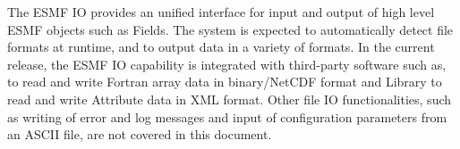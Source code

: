 

The ESMF IO provides an unified interface for input and output of
high level ESMF objects such as Fields.  The system is expected to
automatically detect file formats at runtime, and to output data in 
a variety of formats. In the current release, the ESMF IO capability
is integrated with third-party software such as, 
to read and write Fortran array data in binary/NetCDF format and 
Library to read and write Attribute data in XML format.  Other file IO
functionalities, such as writing of error and log messages and input of
configuration parameters from an ASCII file, are not covered in this
document.


%
%



